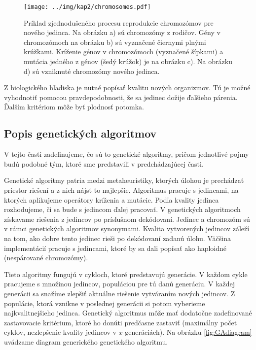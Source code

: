 \begin{figure}[h]
\centering
\centerline{\mbox{\texttt{[image: ../img/kap2/chromosomes.pdf]}}}
\caption{Príklad zjednodušeného procesu reprodukcie chromozómov pre nového jedinca. Na obrázku a) sú chromozómy z rodičov. Gény v chromozómoch na obrázku b) sú vyznačené čiernymi plnými krúžkami. Kríženie génov v chromozómoch (vyznačené šípkami) a mutácia jedného z génov (šedý krúžok) je na obrázku c). Na obrázku d) sú vzniknuté chromozómy nového jedinca.}\label{fig:Chromosomes}
\end{figure}

Z biologického hľadiska je nutné popísať kvalitu nových organizmov. Tú je možné vyhodnotiť pomocou pravdepodobnosti, že sa jedinec dožije ďalšieho párenia. Ďalším kritériom môže byť plodnosť potomka.

\subsection{Popis genetických algoritmov}\label{kap2:2.1:2.1.2:AboutGeneticAlgo}
V tejto časti zadefinujeme, čo sú to genetické algoritmy, pričom jednotlivé pojmy budú podobné tým, ktoré sme predstavili v predchádzajúcej časti. 

Genetické algoritmy patria medzi metaheuristiky, ktorých úlohou je prechádzať priestor riešení a z nich nájsť to najlepšie. Algoritmus pracuje s jedincami, na ktorých aplikujeme operátory kríženia a mutácie. Podľa kvality jedinca rozhodujeme, či sa bude s jedincom ďalej pracovať. V genetických algoritmoch získavame riešenia z jedincov po príslušnom dekódovaní. Jedinec a chromozóm sú v rámci genetických algoritmov synonymami. Kvalita vytvorených jedincov záleží na tom, ako dobre tento jedinec rieši po dekódovaní zadanú úlohu. Väčšina implementácií pracuje s jedincami, ktoré by sa dali popísať ako haploidné (nespárované chromozómy).

Tieto algoritmy fungujú v cykloch, ktoré predstavujú generácie. V každom cykle pracujeme s množinou jedincov, populáciou pre tú danú generáciu. V každej generácii sa snažíme zlepšiť aktuálne riešenie vytváraním nových jedincov.
Z populácie, ktorá vznikne v poslednej generácii si potom vyberieme najkvalitnejšieho jedinca. Genetický algoritmus môže mať dodatočne zadefinované zastavovacie kritérium, ktoré ho donúti predčasne zastaviť (maximálny počet cyklov, nezlepšenie kvality jedincov v $x$ generáciách). Na obrázku \ref{fig:GAdiagram} uvádzame diagram generického genetického algoritmu.

